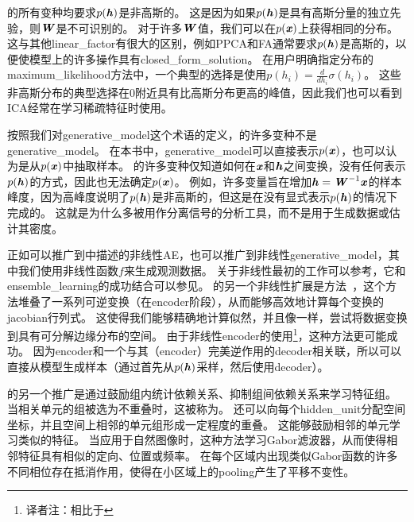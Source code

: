 的所有变种均要求$p(\boldsymbol{\mathit{h}})$是非高斯的。
这是因为如果$p(\boldsymbol{\mathit{h}})$是具有高斯分量的独立先验，则$\boldsymbol{\mathit{W}}$是不可识别的。
对于许多$\boldsymbol{\mathit{W}}$值，我们可以在$p(\boldsymbol{\mathit{x}})$上获得相同的分布。 
这与其他\gls{linear_factor}有很大的区别，例如\gls{PPCA}和\gls{FA}通常要求$p(\boldsymbol{\mathit{h}})$是高斯的，以便使模型上的许多操作具有\gls{closed_form_solution}。
在用户明确指定分布的\gls{maximum_likelihood}方法中，一个典型的选择是使用$p(h_i) = \frac{d}{dh_i}\sigma(h_i)$。
这些非高斯分布的典型选择在$0$附近具有比高斯分布更高的峰值，因此我们也可以看到\gls{ICA}经常在学习稀疏特征时使用。




按照我们对\gls{generative_model}这个术语的定义，的许多变种不是\gls{generative_model}。
在本书中，\gls{generative_model}可以直接表示$p(\boldsymbol{\mathit{x}})$，也可以认为是从$p(\boldsymbol{\mathit{x}})$中抽取样本。
的许多变种仅知道如何在$\boldsymbol{\mathit{x}}$和$\boldsymbol{\mathit{h}}$之间变换，没有任何表示$p(\boldsymbol{\mathit{h}})$的方式，因此也无法确定$p(\boldsymbol{\mathit{x}})$。
例如，许多变量旨在增加$\boldsymbol{\mathit{h}} = \boldsymbol{\mathit{W}}^{-1}\boldsymbol{\mathit{x}}$的样本峰度，因为高峰度说明了$p(\boldsymbol{\mathit{h}})$是非高斯的，但这是在没有显式表示$p(\boldsymbol{\mathit{h}})$的情况下完成的。
这就是为什么多被用作分离信号的分析工具，而不是用于生成数据或估计其密度。


正如可以推广到中描述的非线性\gls{AE}，也可以推广到非线性\gls{generative_model}，其中我们使用非线性函数$f$来生成观测数据。
关于非线性最初的工作可以参考\citet{hyvarinen1999nonlinear}，它和\gls{ensemble_learning}的成功结合可以参见\citet{roberts2001independent,lappalainen2000nonlinear}。
的另一个非线性扩展是方法~\citep{Dinh-et-al-arxiv2014}，这个方法堆叠了一系列可逆变换（在\gls{encoder}阶段），从而能够高效地计算每个变换的\gls{jacobian}行列式。
这使得我们能够精确地计算似然，并且像一样，尝试将数据变换到具有可分解边缘分布的空间。
由于非线性\gls{encoder}的使用\footnote{译者注：相比于}，这种方法更可能成功。
因为\gls{encoder}和一个与其（\gls{encoder}）完美逆作用的\gls{decoder}相关联，所以可以直接从模型生成样本（通过首先从$p(\boldsymbol{\mathit{h}})$采样，然后使用\gls{decoder}）。


的另一个推广是通过鼓励组内统计依赖关系、抑制组间依赖关系来学习特征组。
当相关单元的组被选为不重叠时，这被称为。
还可以向每个\gls{hidden_unit}分配空间坐标，并且空间上相邻的单元组形成一定程度的重叠。
这能够鼓励相邻的单元学习类似的特征。
当应用于自然图像时，这种方法学习Gabor滤波器，从而使得相邻特征具有相似的定向、位置或频率。
在每个区域内出现类似Gabor函数的许多不同相位存在抵消作用，使得在小区域上的\gls{pooling}产生了平移不变性。


